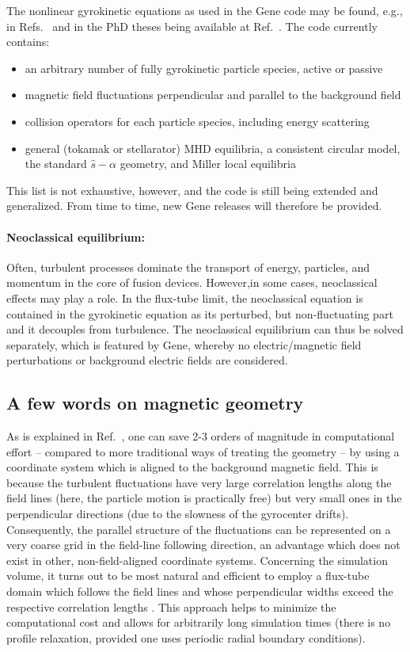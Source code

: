 \documentclass[12pt]{article}
\begin{document}
The nonlinear gyrokinetic equations as used in the {\sc Gene} code
may be found, e.g., in Refs.~\cite{gene1,gene2} and in the PhD theses being available at 
Ref.~\cite{GENE-webpage}. The code currently contains:
\begin{itemize}
\item an arbitrary number of fully gyrokinetic particle species, active or passive
\item magnetic field fluctuations perpendicular and parallel to the background field
\item collision operators for each particle species, including energy scattering
\item general (tokamak or stellarator) MHD equilibria, a consistent circular model, the 
  standard $\hat s-\alpha$ geometry, and Miller local equilibria
\end{itemize}
This list is not exhaustive, however, and the code is still being extended and generalized.
From time to time, new {\sc Gene} releases will therefore be provided.

\paragraph{Neoclassical equilibrium:}

Often, turbulent processes dominate the transport of energy, particles, and momentum
in the core of fusion devices. However,in some cases, neoclassical effects may play a role.
In the flux-tube limit, the neoclassical equation is contained in the
gyrokinetic equation
as its perturbed, but non-fluctuating part and it decouples from turbulence.
The neoclassical equilibrium can thus be solved separately, which is
featured by {\sc Gene}, whereby no electric/magnetic field perturbations or background
electric fields are considered.

\subsection{A few words on magnetic geometry}

As is explained in Ref.~\cite{beer}, one can save 2-3 orders of
magnitude in computational effort -- compared to more traditional
ways of treating the geometry -- by using a coordinate system
which is aligned to the background magnetic field. This is because
the turbulent fluctuations have very large correlation lengths
along the field lines (here, the particle motion is practically
free) but very small ones in the perpendicular directions (due to
the slowness of the gyrocenter drifts). Consequently, the parallel
structure of the fluctuations can be represented on a very coarse
grid in the field-line following direction, an advantage which
does not exist in other, non-field-aligned coordinate systems.
Concerning the simulation volume, it turns out to be most natural
and efficient to employ a flux-tube domain which follows the field
lines and whose perpendicular widths exceed the respective
correlation lengths \cite{beer}. This approach helps to minimize
the computational cost and allows for arbitrarily long simulation
times (there is no profile relaxation, provided one uses periodic
radial boundary conditions).
\end{document}
